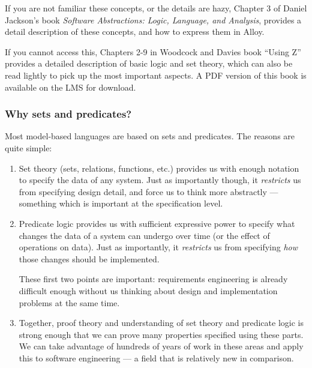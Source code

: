 If you are not familiar these concepts, or the details are hazy, Chapter 3 of Daniel Jackson's book \emph{Software Abstractions: Logic, Language, and Analysis}, provides a detail description of these concepts, and how to express them in Alloy.

If you cannot access this, Chapters 2-9 in Woodcock and Davies book ``Using Z'' \cite{woodcock-using-z} provides a detailed description of basic logic and set theory, which can also be read lightly to pick up the most important aspects. A PDF version of this book is available on the LMS for download.

\subsubsection{Why sets and predicates?}

Most model-based languages are based on sets and predicates. The reasons are quite simple: 

\begin{enumerate}

 \item Set theory (sets, relations, functions, etc.) provides us with enough notation to specify the data of any system. Just as importantly though, it \emph{restricts} us from specifying design detail, and force us to think more abstractly --- something which is important at the specification level. 

 \item Predicate logic provides us with sufficient expressive power to specify what changes the data of a system can undergo over time (or the effect of operations on data). Just as importantly, it \emph{restricts} us from specifying \emph{how} those changes should be implemented.

These first two points are important: requirements engineering is already difficult enough without us thinking about design and implementation problems at the same time.

 \item Together, proof theory and understanding of set theory and predicate logic is strong enough that we can prove many properties specified using these parts. We can take advantage of hundreds of years of work in these areas and apply this to software engineering --- a field that is relatively new in comparison.

\end{enumerate}


